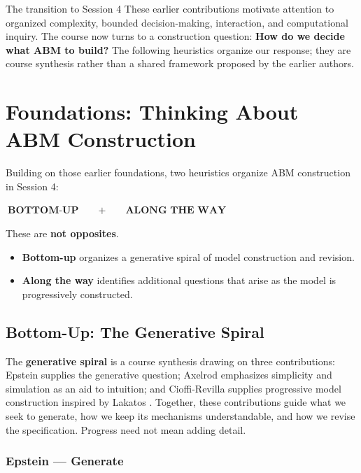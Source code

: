 \documentclass[11pt,a4paper]{article}
\newenvironment{fitdisplay}{\par\medskip\noindent\begin{lrbox}{\displaybox}$\displaystyle}{%
$\end{lrbox}\makebox[\linewidth][c]{\ifdim\wd\displaybox>\linewidth\resizebox{\linewidth}{!}{\usebox{\displaybox}}\else\usebox{\displaybox}\fi}\par\medskip}
\begin{document}
\begin{principle}{The transition to Session 4}
These earlier contributions motivate attention to organized complexity, bounded decision-making, interaction, and computational inquiry. The course now turns to a construction question: \textbf{How do we decide what ABM to build?} The following heuristics organize our response; they are course synthesis rather than a shared framework proposed by the earlier authors.
\end{principle}

\clearpage
\section{Foundations: Thinking About ABM Construction}

Building on those earlier foundations, two heuristics organize ABM construction in Session 4:

\begin{fitdisplay}
\boxed{\textbf{BOTTOM-UP}}
\qquad+\qquad
\boxed{\textbf{ALONG THE WAY}}
\end{fitdisplay}

These are \textbf{not opposites}.

\begin{itemize}
\item \textbf{Bottom-up} organizes a generative spiral of model construction and revision.
\item \textbf{Along the way} identifies additional questions that arise as the model is progressively constructed.
\end{itemize}

\subsection{Bottom-Up: The Generative Spiral}

The \textbf{generative spiral} is a course synthesis drawing on three contributions: Epstein supplies the generative question; Axelrod emphasizes simplicity and simulation as an aid to intuition; and Cioffi-Revilla supplies progressive model construction inspired by Lakatos \cite{epstein,axelrod_complexity_1997,cioffi}. Together, these contributions guide what we seek to generate, how we keep its mechanisms understandable, and how we revise the specification. Progress need not mean adding detail.

\subsubsection{Epstein --- Generate}
\end{document}
